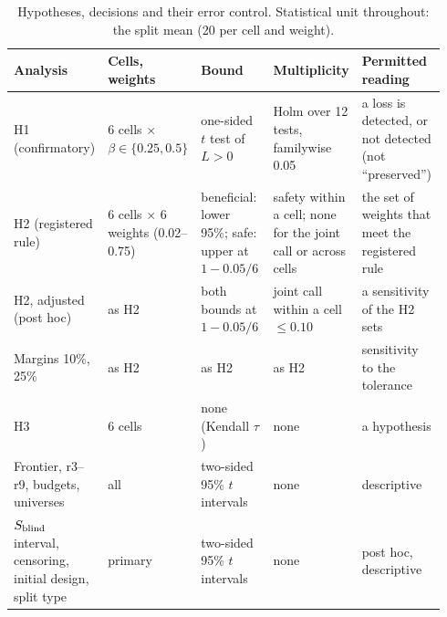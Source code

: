 \begin{table}[t]
\centering\footnotesize
\caption{Hypotheses, decisions and their error control. Statistical unit throughout: the split mean (20 per cell and weight).}
\label{tab:errors}
\setlength{\tabcolsep}{3pt}
\begin{tabular}{@{}p{0.15\linewidth}p{0.17\linewidth}p{0.2\linewidth}p{0.2\linewidth}p{0.22\linewidth}@{}}
\toprule
Analysis & Cells, weights & Bound & Multiplicity & Permitted reading \\
\midrule
H1 (confirmatory) & 6 cells $\times$ $\beta\in\{0.25,0.5\}$ & one-sided $t$ test of $L>0$ & Holm over 12 tests, familywise 0.05 & a loss is detected, or not detected (not ``preserved'') \\
H2 (registered rule) & 6 cells $\times$ 6 weights (0.02--0.75) & beneficial: lower 95\%; safe: upper at $1-0.05/6$ & safety within a cell; none for the joint call or across cells & the set of weights that meet the registered rule \\
H2, adjusted (post hoc) & as H2 & both bounds at $1-0.05/6$ & joint call within a cell $\le0.10$ & a sensitivity of the H2 sets \\
Margins 10\%, 25\% & as H2 & as H2 & as H2 & sensitivity to the tolerance \\
H3 & 6 cells & none (Kendall $\tau$) & none & a hypothesis \\
Frontier, r3--r9, budgets, universes & all & two-sided 95\% $t$ intervals & none & descriptive \\
$S_{\mathrm{blind}}$ interval, censoring, initial design, split type & primary & two-sided 95\% $t$ intervals & none & post hoc, descriptive \\
\bottomrule
\end{tabular}
\end{table}


